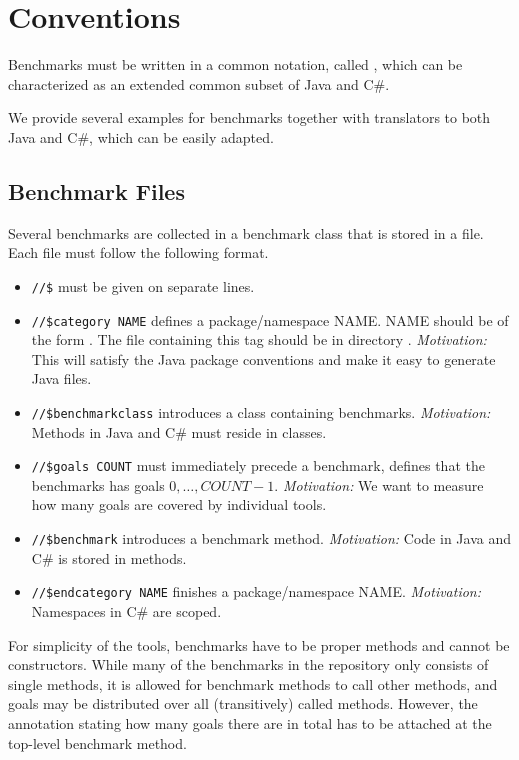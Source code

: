 \section{Conventions}

Benchmarks must be written in a common notation, called ,
which can be characterized as an extended common subset of Java and C\#.

We provide several examples for  benchmarks together with translators to both Java and C\#, 
which can be easily adapted.

\subsection{Benchmark Files}

Several benchmarks are collected in a benchmark class that is stored in a file.
Each file must follow the following format.

\begin{itemize}
\item {\tt //\$} must be given on separate lines.
\item {\tt //\$category NAME} defines a package/namespace NAME. NAME should be of the form . The file containing this tag should be in directory .
{\it Motivation:} This will satisfy the Java package conventions and make it easy to generate Java files. 
\item {\tt //\$benchmarkclass} introduces a class containing benchmarks.
{\it Motivation:} Methods in Java and C\# must reside in classes.
\item {\tt //\$goals COUNT} must immediately precede a benchmark, defines that the benchmarks has goals $0, \ldots, COUNT-1$.
{\it Motivation:} We want to measure how many goals are covered by individual tools.
\item {\tt //\$benchmark} introduces a benchmark method.
{\it Motivation:} Code in Java and C\# is stored in methods.
\item {\tt //\$endcategory NAME} finishes a package/namespace NAME.
{\it Motivation:} Namespaces in C\# are scoped.
\end{itemize}

For simplicity of the tools, benchmarks have to be proper methods and cannot be constructors.
While many of the benchmarks in the repository only consists of single methods,
it is allowed for benchmark methods to call other methods,
and goals may be distributed over all (transitively) called methods.
However, the annotation stating how many goals there are in total has to be attached at the top-level benchmark method.

